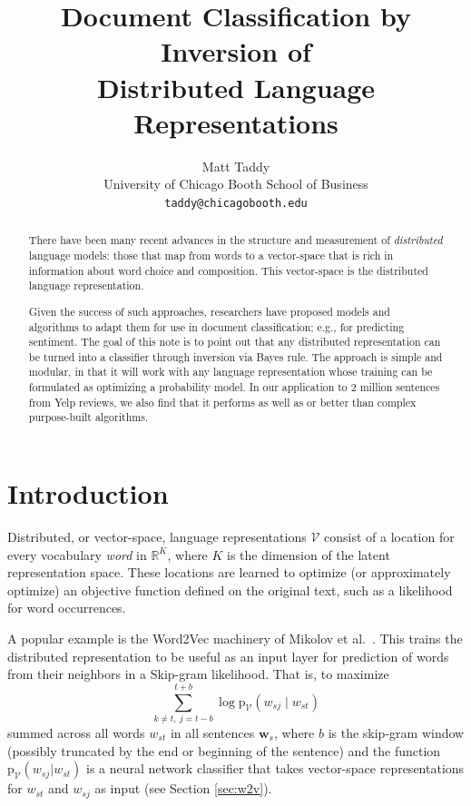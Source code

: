 \documentclass[11pt]{article}
\title{Document Classification by Inversion of \\Distributed Language Representations}
\author{Matt Taddy \\
  University of Chicago Booth School of Business \\
  {\tt taddy@chicagobooth.edu} \\}
\date{}
\begin{document}
\maketitle
\begin{abstract}
There have been many recent advances in the structure and measurement of {\it distributed} language models: those that map from words to a vector-space that is rich in information about word choice and composition.  This vector-space is the distributed language representation.    

Given the success of such approaches,  researchers have proposed
models and algorithms to adapt them for use in document classification; e.g., for predicting sentiment.  The goal of this note is to point out that any distributed  representation can be turned into a classifier through inversion via Bayes rule.  
The approach is simple and modular, in that it will work with any language representation whose training can be formulated as optimizing a probability model. In our application to 2 million sentences from Yelp reviews, we also find that it performs as well as or better than  complex purpose-built algorithms. \end{abstract}

\section{Introduction}

Distributed, or vector-space, language representations $\mathcal{V}$ consist
of a location for every vocabulary {\it word} in $\mathds{R}^K$, where $K$ is
the dimension of the latent representation space.  These locations are learned
to optimize (or approximately optimize) an objective function defined on the
original text, such as a likelihood for word occurrences.

A popular example is the Word2Vec machinery of
Mikolov et al.~.  This trains the distributed
representation to be useful as an input layer for prediction of words from
their neighbors in a Skip-gram likelihood.  That is, to maximize
\begin{equation}\label{eq:skipgram}
\sum_{k\neq t,~j=t-b}^{t+b} \log\mathrm{p}_{\mathcal{V}}(w_{sj}\mid w_{st})
\end{equation}
summed across all words $w_{st}$ in all sentences $\mathbf{w}_s$, where $b$ is
the skip-gram window (possibly truncated by the end or beginning of the
sentence) and the function $\mathrm{p}_{\mathcal{V}}(w_{sj}| w_{st})$ is a neural network
classifier that takes vector-space representations for $w_{st}$ and $w_{sj}$
as input (see Section \ref{sec:w2v}).
\end{document}
